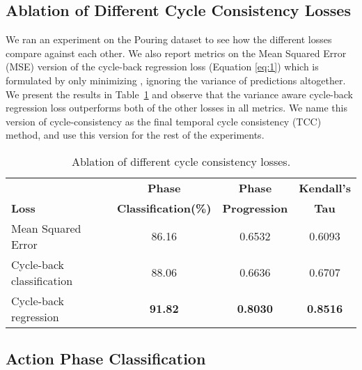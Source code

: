 \documentclass[10pt,twocolumn,letterpaper]{article}
\begin{document}
\subsection{Ablation of Different Cycle Consistency Losses}
We ran an experiment on the Pouring dataset to see how the different losses compare against each other. We also report metrics on the Mean Squared Error (MSE) version of the cycle-back regression loss (Equation \ref{eq:1}) which is formulated by only minimizing , ignoring the variance of predictions altogether. We present the results in Table~\ref{tab:pouring_loss_ablation} and observe that the variance aware cycle-back regression loss outperforms both of the other losses in all metrics. We name this version of cycle-consistency as the final temporal cycle consistency (TCC) method, and use this version for the rest of the experiments.


\begin{table}[!h]
\setlength{\tabcolsep}{0.3em}

\centering
\footnotesize{
    \begin{tabular}{l|c|c|c}
    \toprule
      &   \textbf{Phase}  & \textbf{Phase}  & \textbf{Kendall's}\\
        \textbf{Loss} &   \textbf{Classification(\%)}  & \textbf{Progression}  & \textbf{Tau}\\
        \midrule
         Mean Squared Error & 86.16 & 0.6532 & 0.6093\\
        Cycle-back classification & 88.06 &  0.6636 & 0.6707  \\
        Cycle-back regression & \textbf{91.82} & \textbf{0.8030} & \textbf{0.8516}\\
    \bottomrule
    \end{tabular}
\caption{Ablation of different cycle consistency losses.}
\label{tab:pouring_loss_ablation}
}
\vspace{-1em}
\end{table}


\subsection{Action Phase Classification}
\end{document}
